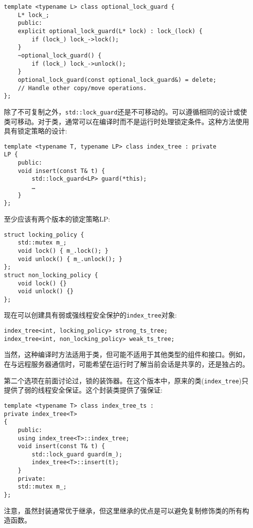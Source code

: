 \begin{lstlisting}[style=styleCXX]
template <typename L> class optional_lock_guard {
	L* lock_;
	public:
	explicit optional_lock_guard(L* lock) : lock_(lock) {
		if (lock_) lock_->lock();
	}
	~optional_lock_guard() {
		if (lock_) lock_->unlock();
	}
	optional_lock_guard(const optional_lock_guard&) = delete;
	// Handle other copy/move operations.
};
\end{lstlisting}

除了不可复制之外，\texttt{std::lock\_guard}还是不可移动的。可以遵循相同的设计或使类可移动。对于类，通常可以在编译时而不是运行时处理锁定条件。这种方法使用具有锁定策略的设计:

\begin{lstlisting}[style=styleCXX]
template <typename T, typename LP> class index_tree : private 
LP {
	public:
	void insert(const T& t) {
		std::lock_guard<LP> guard(*this);
		…
	}
};
\end{lstlisting}

至少应该有两个版本的锁定策略LP:

\begin{lstlisting}[style=styleCXX]
struct locking_policy {
	std::mutex m_;
	void lock() { m_.lock(); }
	void unlock() { m_.unlock(); }
};
struct non_locking_policy {
	void lock() {}
	void unlock() {}
};
\end{lstlisting}

现在可以创建具有弱或强线程安全保护的\texttt{index\_tree}对象:

\begin{lstlisting}[style=styleCXX]
index_tree<int, locking_policy> strong_ts_tree;
index_tree<int, non_locking_policy> weak_ts_tree;
\end{lstlisting}

当然，这种编译时方法适用于类，但可能不适用于其他类型的组件和接口。例如，在与远程服务器通信时，可能希望在运行时了解当前会话是共享的，还是独占的。

第二个选项在前面讨论过，锁的装饰器。在这个版本中，原来的类(\texttt{index\_tree})只提供了弱的线程安全保证。这个封装类提供了强保证:

\begin{lstlisting}[style=styleCXX]
template <typename T> class index_tree_ts :
private index_tree<T> 
{
	public:
	using index_tree<T>::index_tree;
	void insert(const T& t) {
		std::lock_guard guard(m_);
		index_tree<T>::insert(t);
	}
	private:
	std::mutex m_;
};
\end{lstlisting}

注意，虽然封装通常优于继承，但这里继承的优点是可以避免复制修饰类的所有构造函数。 

